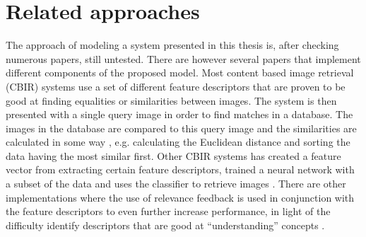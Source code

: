 \section{Related approaches}
\label{sec:method:rel_approaches}
The approach of modeling a system presented in this thesis is, after checking numerous papers, still untested.
There are however several papers that implement different components of the proposed model.
Most content based image retrieval (CBIR) systems use a set of different feature descriptors that are proven to be good at finding equalities or similarities between images. The system is then presented with a single query image in order to find matches in a database. The images in the database are compared to this query image and the similarities are calculated in some way \cite{wang2001simplicity}\cite{subrahmanyam2013modified}\cite{nagaraja2015low}, e.g. calculating the Euclidean distance and sorting the data having the most similar first.
Other CBIR systems has created a feature vector from extracting certain feature descriptors, trained a neural network with a subset of the data and uses the classifier to retrieve images \cite{elalami2014new}. 
There are other implementations where the use of relevance feedback is used in conjunction with the feature descriptors to even further increase performance, in light of the difficulty identify descriptors that are good at ``understanding'' concepts \cite{wang2015new}. 
